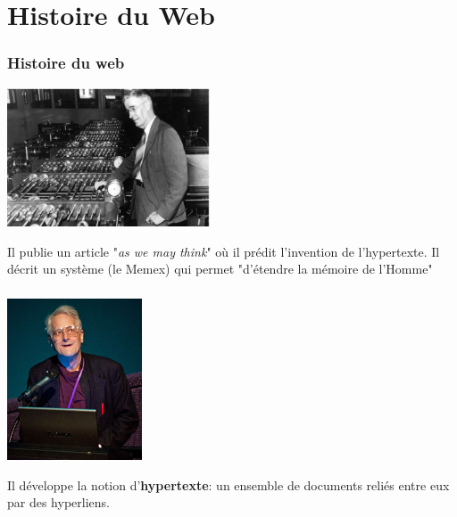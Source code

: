 \documentclass[svgnames,11pt]{beamer}
\begin{document}
\section{Histoire du Web}
\begin{frame}
    \frametitle{Histoire du web}

    \begin{center}
        \centering
        \includegraphics[width=6cm]{ressources/bush.png}
        \label{IMG}
    \end{center}
    \begin{aretenir}[]
        Il publie un article "\emph{as we may think}" où il prédit l'invention de l'hypertexte. Il décrit un système (le Memex) qui permet "d'étendre la mémoire de l'Homme"
    \end{aretenir}
\end{frame}
\begin{frame}
    \frametitle{}

    \begin{center}
        \centering
        \includegraphics[width=4cm]{ressources/nelson.jpg}
        \label{IMG}
    \end{center}
    \begin{aretenir}[]
        Il développe la notion d'\textbf{hypertexte}: un ensemble de documents reliés entre eux par des hyperliens.
    \end{aretenir}
\end{frame}
\end{document}
